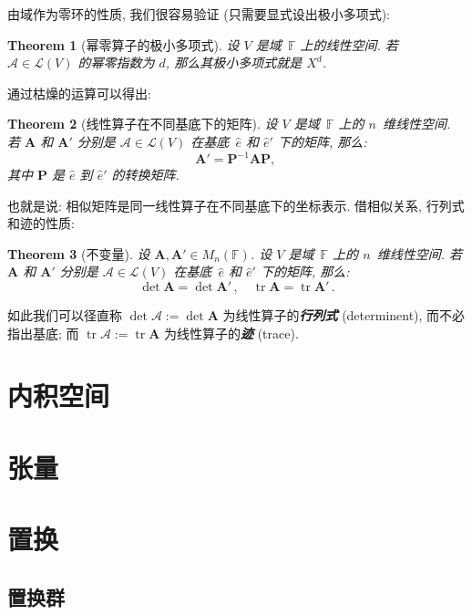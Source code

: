 \documentclass[openany]{ctexbook}
\newcommand*{\indexbf}[1]{\emph{\textbf{#1}}\index{#1}} %
\theoremstyle{plain}
\newtheorem{theorem}{Theorem}[section] %
\theoremstyle{definition}
\newcommand*{\bv}{\boldsymbol} %
\DeclareMathOperator{\tr}{tr}
\begin{document}
由域作为零环的性质, 我们很容易验证 (只需要显式设出极小多项式):

\begin{theorem}[幂零算子的极小多项式]
	设 $V$ 是域~$\mathbb F$ 上的线性空间. 若 $\mathscr A \in \mathcal L(V)$ 的幂零指数为 $d$, 那么其极小多项式就是 $X^d$.
\end{theorem}


通过枯燥的运算可以得出:
\begin{theorem}[线性算子在不同基底下的矩阵]
	设 $V$ 是域~$\mathbb F$ 上的 $n$~维线性空间. 若 $\bv A$ 和 $\bv A'$ 分别是 $\mathscr A \in \mathcal L(V)$ 在基底~$\hat e$ 和 $\hat e'$ 下的矩阵, 那么:
	\begin{equation*}
		\bv A' = \bv P^{-1} \bv A \bv P,\,
	\end{equation*}
	其中 $\bv P$ 是 $\hat e$ 到 $\hat e'$ 的转换矩阵.
\end{theorem}

也就是说: 相似矩阵是同一线性算子在不同基底下的坐标表示.
借相似关系, 行列式和迹的性质:

\begin{theorem}[不变量]
	设 $\bv A, \bv A' \in M_n(\mathbb F)$. 
	设 $V$ 是域~$\mathbb F$ 上的 $n$~维线性空间. 若 $\bv A$ 和 $\bv A'$ 分别是 $\mathscr A \in \mathcal L(V)$ 在基底~$\hat e$ 和 $\hat e'$ 下的矩阵, 那么:
	\begin{equation*}
		\det \bv A = \det \bv A'\,, \quad
		\tr \bv A = \tr \bv A'\,.
	\end{equation*}
\end{theorem}

如此我们可以径直称 $\det \mathscr A := \det \bv A$ 为线性算子的\indexbf{行列式} (determinent), 而不必指出基底;
而 $\tr \mathscr A := \tr \bv A$ 为线性算子的\indexbf{迹} (trace).

\chapter{内积空间}

\chapter{张量}
	\label{chapter:张量}


\appendix
\chapter{置换}
\section{置换群}
\end{document}
